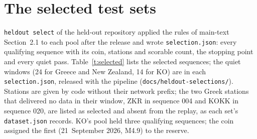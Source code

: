 \documentclass[11pt,a4paper]{article}
\newcommand{\tool}[1]{\nolinkurl{#1}}
\begin{document}
\clearpage
\section{The selected test sets}\label{s:selected}

\tool{heldout select} of the held-out repository applied the rules of
main-text Section~2.1 to each pool after the release and wrote
\tool{selection.json}: every qualifying sequence with its coin, stations and scorable
count, the stopping point and every quiet pass. Table~\ref{t:selected} lists the
selected sequences; the quiet windows (24 for Greece and New Zealand, 14 for KO) are
in each \tool{selection.json}, released with the pipeline (\tool{docs/heldout-selections/}).
Stations are given by code without their network prefix; the two Greek stations that
delivered no data in their window, ZKR in sequence 004 and KOKK in sequence 020, are
listed as selected and absent from the replay, as each set's \tool{dataset.json}
records. KO's pool held three qualifying sequences; the coin assigned the first
(21~September 2026, M4.9) to the reserve.
\end{document}
